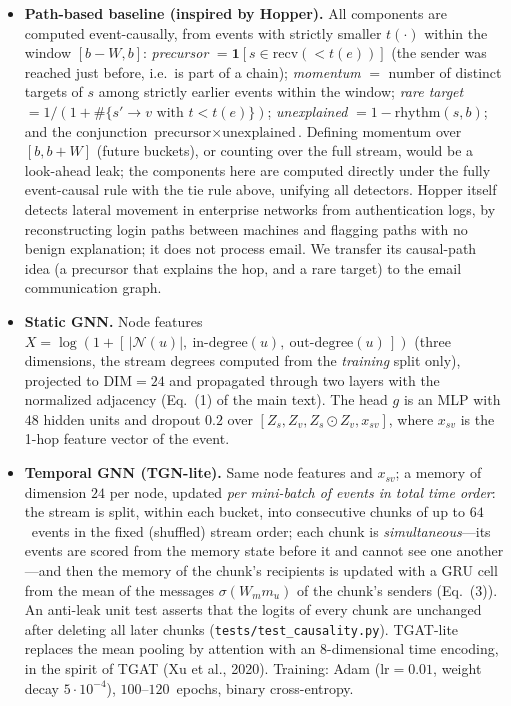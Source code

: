 \documentclass[a4paper,11pt]{article}
\begin{document}
\begin{itemize}
  per-sender-deviation idea to email headers, restricted to volume and timing.
  \item \textbf{Path-based baseline (inspired by Hopper).} All components are computed event-causally,
  from events with strictly smaller $t(\cdot)$ within the window $[b-W,b]$:
  \emph{precursor} $=\mathbf{1}[s\in\mathrm{recv}(<t(e))]$
  (the sender was reached just before, i.e.\ is part of a chain); \emph{momentum} $=$ number of distinct
  targets of $s$ among strictly earlier events within the window; \emph{rare target}
  $=1/(1+\#\{s'\!\to\!v \text{ with } t<t(e)\})$;
  \emph{unexplained} $=1-\mathrm{rhythm}(s,b)$; and the conjunction $\text{precursor}\times\text{unexplained}$.
  Defining momentum over $[b,b+W]$ (future buckets), or counting over the full stream,
  would be a look-ahead leak; the components here are computed directly under the fully event-causal rule
  with the tie rule above, unifying all detectors.
  Hopper itself detects lateral movement in enterprise networks from authentication logs, by reconstructing
  login paths between machines and flagging paths with no benign explanation; it does not process email. We
  transfer its causal-path idea (a precursor that explains the hop, and a rare target) to the email
  communication graph.
  \item \textbf{Static GNN.} Node features $X=\log(1+[\,|\mathcal{N}(u)|,\ \text{in-degree}(u),\ \text{out-degree}(u)\,])$
  (three dimensions, the stream degrees computed from the \emph{training} split only), projected to $\mathrm{DIM}{=}24$ and propagated through two
  layers with the normalized adjacency (Eq.~(1) of the main text). The head $g$ is an MLP with $48$ hidden
  units and dropout $0.2$ over $[Z_s, Z_v, Z_s\!\odot\!Z_v, x_{sv}]$, where $x_{sv}$ is the 1-hop feature vector
  of the event.
  \item \textbf{Temporal GNN (TGN-lite).} Same node features and $x_{sv}$; a memory of dimension $24$ per node,
  updated \emph{per mini-batch of events in total time order}: the stream is split, within each bucket,
  into consecutive chunks of up to $64$~events in the fixed (shuffled) stream order; each chunk is
  \emph{simultaneous}---its events are scored from the memory state before it and cannot see one
  another---and then the memory of the chunk's recipients is updated with a GRU cell from the mean of the
  messages $\sigma(W_m m_u)$ of the chunk's senders (Eq.~(3)). An anti-leak unit test asserts that the
  logits of every chunk are unchanged after deleting all later chunks (\texttt{tests/test\_causality.py}).
  TGAT-lite replaces the mean pooling by attention
  with an $8$-dimensional time encoding, in the spirit of TGAT (Xu et al., 2020). Training: Adam ($\mathrm{lr}{=}0.01$, weight decay $5\cdot10^{-4}$),
  $100$--$120$~epochs, binary cross-entropy.
\end{itemize}
\end{document}
